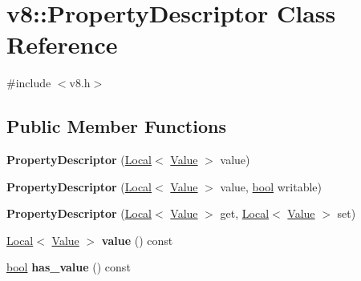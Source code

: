 \hypertarget{classv8_1_1PropertyDescriptor}{}\section{v8\+:\+:Property\+Descriptor Class Reference}
\label{classv8_1_1PropertyDescriptor}


{\ttfamily \#include $<$v8.\+h$>$}

\subsection*{Public Member Functions}
\begin{DoxyCompactItemize}
\item 
\mbox{\label{classv8_1_1PropertyDescriptor_a82ac167b677a5b8689b7a54220848281}} 
{\bfseries Property\+Descriptor} (\mbox{\hyperlink{classv8_1_1Local}{Local}}$<$ \mbox{\hyperlink{classv8_1_1Value}{Value}} $>$ value)
\item 
\mbox{\label{classv8_1_1PropertyDescriptor_a9e9c501803e6cf9a75352ae6354c4dc0}} 
{\bfseries Property\+Descriptor} (\mbox{\hyperlink{classv8_1_1Local}{Local}}$<$ \mbox{\hyperlink{classv8_1_1Value}{Value}} $>$ value, \mbox{\hyperlink{classbool}{bool}} writable)
\item 
\mbox{\label{classv8_1_1PropertyDescriptor_a537ec17ed2957629ec633a7c04907dd2}} 
{\bfseries Property\+Descriptor} (\mbox{\hyperlink{classv8_1_1Local}{Local}}$<$ \mbox{\hyperlink{classv8_1_1Value}{Value}} $>$ get, \mbox{\hyperlink{classv8_1_1Local}{Local}}$<$ \mbox{\hyperlink{classv8_1_1Value}{Value}} $>$ set)
\item 
\mbox{\label{classv8_1_1PropertyDescriptor_ad3834d267a32460d2dd1ec35ecb6c2d8}} 
\mbox{\hyperlink{classv8_1_1Local}{Local}}$<$ \mbox{\hyperlink{classv8_1_1Value}{Value}} $>$ {\bfseries value} () const
\item 
\mbox{\label{classv8_1_1PropertyDescriptor_a402608f890da55ed63a8a1b86f5c9693}} 
\mbox{\hyperlink{classbool}{bool}} {\bfseries has\+\_\+value} () const
\item 
\mbox{\label{classv8_1_1PropertyDescriptor_a28991c18acb30e8a3f68bc2c9f622dcc}} 

\end{DoxyCompactItemize}
